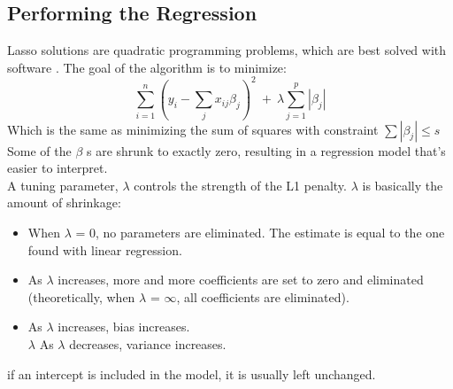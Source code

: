 \documentclass[a4paper,12pt,twoside]{book}
\begin{document}
\subsection{Performing the Regression}
Lasso solutions are quadratic programming problems, which are best solved with software . The goal of the algorithm is to minimize:\\
\[\sum_{i=1}^n(y_i-\sum_{j}x_{ij}\beta_{j})^2\:+\:\lambda\sum_{j=1}^p|\beta_j|\]
Which is the same as minimizing the sum of squares with constraint $\sum |\beta_j| \leq s $ Some of the $\beta$ s are shrunk to exactly zero, resulting in a regression model that’s easier to interpret.\\
A tuning parameter, $\lambda$ controls the strength of the L1 penalty. $\lambda$ is basically the amount of shrinkage:\\
\begin{itemize}
\item When $\lambda$ = 0, no parameters are eliminated. The estimate is equal to the one found with linear regression.\\
\item As $\lambda$ increases, more and more coefficients are set to zero and eliminated (theoretically, when $\lambda$ = $\infty$, all coefficients are eliminated).\\
\item As $\lambda$ increases, bias increases.\\
$\lambda$ As $\lambda$ decreases, variance increases.
\end{itemize}
if an intercept is included in the model, it is usually left unchanged.\\
\end{document}

